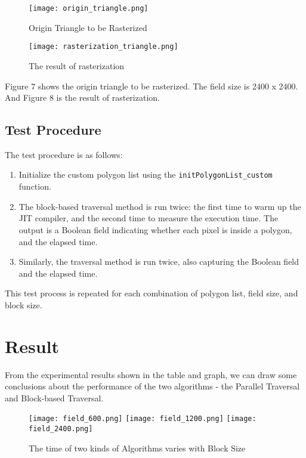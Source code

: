 \documentclass[
	a4paper, %
	10pt, %
	unnumberedsections, %
	twoside, %
]{LTJournalArticle}
\begin{document}
\begin{figure}[H] %
	\texttt{[image: origin\_triangle.png]}
	\caption{Origin Triangle to be Rasterized}
\end{figure}

\begin{figure}[H] %
	\texttt{[image: rasterization\_triangle.png]}
	\caption{The result of rasterization}
\end{figure}

Figure 7 shows the origin triangle to be rasterized. The field size is 2400 x 2400. And Figure 8 is the result of rasterization.

\subsection{Test Procedure}

The test procedure is as follows:

\begin{enumerate}
    \item Initialize the custom polygon list using the \texttt{initPolygonList\_custom} function.
    
    \item The block-based traversal method is run twice: the first time to warm up the JIT compiler, and the second time to measure the execution time. The output is a Boolean field indicating whether each pixel is inside a polygon, and the elapsed time.
    
    \item Similarly, the traversal method is run twice, also capturing the Boolean field and the elapsed time.
\end{enumerate}

This test process is repeated for each combination of polygon list, field size, and block size.

\section{Result}

From the experimental results shown in the table and graph, we can draw some conclusions about the performance of the two algorithms - the Parallel Traversal and Block-based Traversal.

\begin{figure}[H] %
	\texttt{[image: field\_600.png]}
	\texttt{[image: field\_1200.png]}
	\texttt{[image: field\_2400.png]}
	\caption{The time of two kinds of Algorithms varies with Block Size}
\end{figure}
\end{document}
